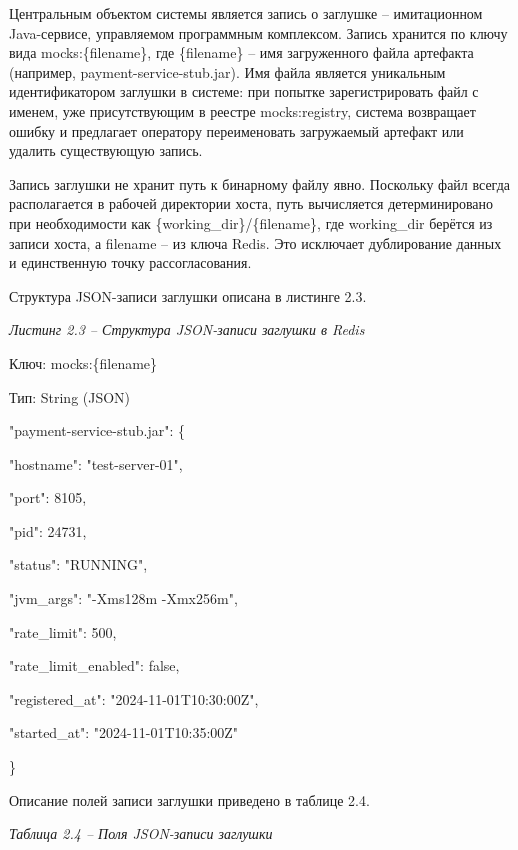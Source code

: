 \documentclass[
]{article}
\begin{document}
Центральным объектом системы является запись о заглушке -- имитационном
Java-сервисе, управляемом программным комплексом. Запись хранится по
ключу вида mocks:\{filename\}, где \{filename\} -- имя загруженного
файла артефакта (например, payment-service-stub.jar). Имя файла является
уникальным идентификатором заглушки в системе: при попытке
зарегистрировать файл с именем, уже присутствующим в реестре
mocks:registry, система возвращает ошибку и предлагает оператору
переименовать загружаемый артефакт или удалить существующую запись.

Запись заглушки не хранит путь к бинарному файлу явно. Поскольку файл
всегда располагается в рабочей директории хоста, путь вычисляется
детерминировано при необходимости как \{working\_dir\}/\{filename\}, где
working\_dir берётся из записи хоста, а filename -- из ключа Redis. Это
исключает дублирование данных и единственную точку рассогласования.

Структура JSON-записи заглушки описана в листинге 2.3.

\emph{Листинг 2.3 -- Структура JSON-записи заглушки в Redis}

Ключ: mocks:\{filename\}

Тип: String (JSON)

"payment-service-stub.jar": \{

"hostname": "test-server-01",

"port": 8105,

"pid": 24731,

"status": "RUNNING",

"jvm\_args": "-Xms128m -Xmx256m",

"rate\_limit": 500,

"rate\_limit\_enabled": false,

"registered\_at": "2024-11-01T10:30:00Z",

"started\_at": "2024-11-01T10:35:00Z"

\}

Описание полей записи заглушки приведено в таблице 2.4.

\emph{Таблица 2.4 -- Поля JSON-записи заглушки}
\end{document}
